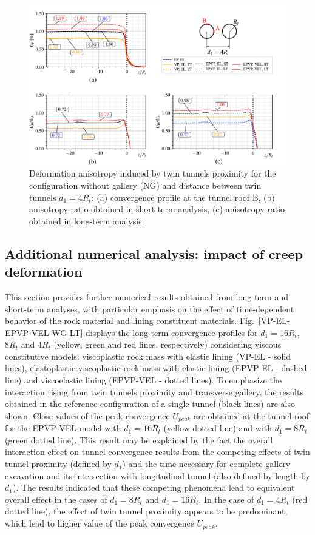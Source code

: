 \documentclass[a4paper,fleqn]{cas-sc}
\begin{document}
\begin{figure}[h!]
	\centering
	\includegraphics[scale=0.65]{Convergence Profiles - UB - UAUB - $d_1=4R_t - ST_Lt$.pdf}
	\caption{Deformation anisotropy induced by twin tunnels proximity for the configuration without gallery (NG) and distance between twin tunnels $d_1=4R_t$: (a) convergence profile at the tunnel roof B, (b) anisotropy ratio obtained in short-term analysis, (c) anisotropy ratio obtained in long-term analysis.}
	\label{UB-UAUB-D1_4RT}
\end{figure}
\FloatBarrier

\subsection{Additional numerical analysis: impact of creep deformation}\label{sec73}

This section provides further numerical results obtained from long-term and short-term analyses, with particular emphasis on the effect of time-dependent behavior of the rock material and lining constituent materials. Fig.~\ref{VP-EL-EPVP-VEL-WG-LT} displays the long-term convergence profiles for $d_1=16R_t$, $8R_t$ and $4R_t$ (yellow, green and red lines, respectively) considering viscous constitutive models: viscoplastic rock mass with elastic lining (VP-EL - solid lines), elastoplastic-viscoplastic rock mass with elastic lining (EPVP-EL - dashed line) and viscoelastic lining (EPVP-VEL - dotted lines). To emphasize the interaction rising from twin tunnels proximity and transverse gallery, the results obtained in the reference configuration of a single tunnel (black lines) are also shown. Close values of the peak convergence  $U_{peak}$ are obtained at the tunnel roof for the EPVP-VEL model with $d_1=16R_t$ (yellow dotted line) and with $d_1=8R_t$ (green dotted line). This result may be explained by the fact the overall interaction effect on tunnel convergence results from the competing effects of twin tunnel proximity (defined by $d_1$) and the time necessary for complete gallery excavation and its intersection with longitudinal tunnel (also defined by length by $d_1$). The results indicated that these competing phenomena lead to equivalent overall effect in the cases of $d_1=8R_t$ and $d_1=16R_t$. In the case of $d_1=4R_t$ (red dotted line), the effect of twin tunnel proximity appears to be predominant, which lead to higher value of the peak convergence  $U_{peak}$.
\end{document}
